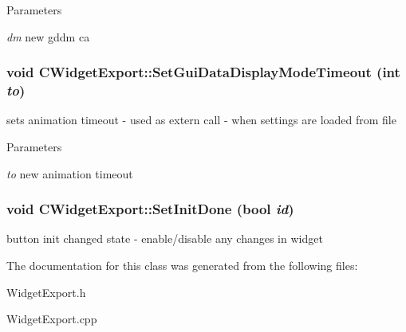 \begin{DoxyParams}{Parameters}
\item[{\em dm}]new gddm ca \end{DoxyParams}
\hypertarget{classCWidgetExport_a28e7d14090b6d2d9fc39e923713d5672}{
\subsubsection[{SetGuiDataDisplayModeTimeout}]{\setlength{\rightskip}{0pt plus 5cm}void CWidgetExport::SetGuiDataDisplayModeTimeout (int {\em to})}}
\label{classCWidgetExport_a28e7d14090b6d2d9fc39e923713d5672}
sets animation timeout -\/ used as extern call -\/ when settings are loaded from file


\begin{DoxyParams}{Parameters}
\item[{\em to}]new animation timeout \end{DoxyParams}
\hypertarget{classCWidgetExport_a0cc01c9e8ef9c95e227a3cc27f75d166}{
\subsubsection[{SetInitDone}]{\setlength{\rightskip}{0pt plus 5cm}void CWidgetExport::SetInitDone (bool {\em id})}}
\label{classCWidgetExport_a0cc01c9e8ef9c95e227a3cc27f75d166}
button init changed state -\/ enable/disable any changes in widget 

The documentation for this class was generated from the following files:\begin{DoxyCompactItemize}
\item 
WidgetExport.h\item 
WidgetExport.cpp\end{DoxyCompactItemize}
